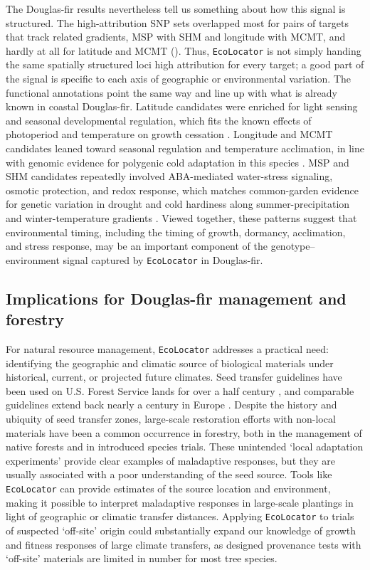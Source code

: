 \documentclass[]{article}
\newcommand{\dfir}{Douglas-fir\xspace}
\newcommand{\ecolocator}{\texttt{EcoLocator}\xspace}
\begin{document}
The \dfir results nevertheless tell us something
about how this signal is structured.
The high-attribution SNP sets overlapped most for pairs of targets
that track related gradients, MSP with SHM and longitude with MCMT,
and hardly at all for latitude and MCMT ().
Thus, \ecolocator is not simply handing the same spatially structured loci
high attribution for every target; a good part of the signal
is specific to each axis of geographic or environmental variation.
The functional annotations point the same way and line up with
what is already known in coastal \dfir.
Latitude candidates were enriched for light sensing and seasonal
developmental regulation, which fits the known effects of photoperiod
and temperature on growth cessation \citep{ford_photoperiod_2017}.
Longitude and MCMT candidates leaned toward seasonal regulation
and temperature acclimation, in line with genomic evidence for
polygenic cold adaptation in this species \citep{delatorre_polygenic_2021}.
MSP and SHM candidates repeatedly involved ABA-mediated water-stress signaling,
osmotic protection, and redox response, which matches common-garden evidence
for genetic variation in drought and cold hardiness along
summer-precipitation and winter-temperature gradients
\citep{bansal_tolerance_2016}. Viewed together,
these patterns suggest that environmental timing, including the timing of growth, 
dormancy, acclimation, and stress response, may be an important component of the 
genotype--environment signal captured by \ecolocator in \dfir.

\subsection{Implications for \dfir management and forestry}

For natural resource management,
\ecolocator addresses a practical need:
identifying the geographic and climatic source of biological materials
under historical, current, or projected future climates.
Seed transfer guidelines have been used on U.S. Forest Service lands
for over a half century \citep{kummel_forest_1944}, and comparable guidelines 
extend back nearly a century in Europe \citep{myking_historic_2016}. 
Despite the history and ubiquity of seed transfer zones, 
large-scale restoration efforts with non-local materials have been a 
common occurrence in forestry, both in the management of native forests
and in introduced species trials.
These unintended `local adaptation experiments' provide clear examples of 
maladaptive responses, but they are usually associated with a poor
understanding of the seed source. Tools like \ecolocator can
provide estimates of the source location and environment,
making it possible to interpret maladaptive responses in large-scale 
plantings in light of geographic or climatic transfer distances. 
Applying \ecolocator to trials of suspected `off-site' origin could
substantially expand our knowledge of growth and
fitness responses of large climate transfers, as designed provenance tests with 
`off-site' materials are limited in number for most tree species.
\end{document}
